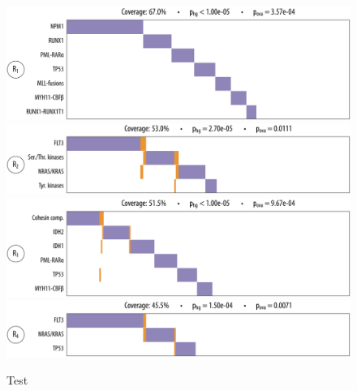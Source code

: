\begin{figure}[htb]
\centering
\includegraphics[width=\textwidth]{figures/genes/aml_1.pdf}\\[2em]
\includegraphics[width=\textwidth]{figures/genes/aml_2.pdf}\\[2em]
\includegraphics[width=\textwidth]{figures/genes/aml_3.pdf}\\[2em]
\includegraphics[width=\textwidth]{figures/genes/aml_4.pdf}\\[2em]
\caption{Test}
\end{figure}

